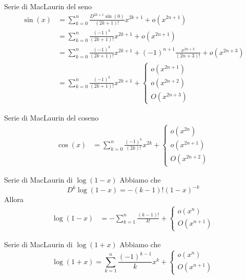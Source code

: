 \documentclass[a4paper]{article}
\begin{document}
\begin{snippetproposition}{Serie di MacLaurin del seno}
    \begin{align*}
        \sin(x) &= \sum_{k=0}^n \frac{D^{2k+1}\sin(0)}{(2k+1)!} x^{2k+1} + o(x^{2n+1}) \\
        &= \sum_{k=0}^n \frac{{(-1)}^k}{(2k+1)!} x^{2k+1} + o(x^{2n+1}) \\
        &= \sum_{k=0}^n \frac{{(-1)}^k}{(2k+1)!} x^{2k+1} + {(-1)}^{n+1}
        \frac{x^{2n+3}}{(2n+3)!} + o(x^{2n+3}) \\
        &= \sum_{k=0}^n \frac{{(-1)}^k}{(2k+1)!} x^{2k+1} + \begin{cases}
            o(x^{2n+1}) \\
            o(x^{2n+2}) \\
            O(x^{2n+3})
        \end{cases}
    \end{align*}
\end{snippetproposition}

\begin{snippetproposition}{Serie di MacLaurin del coseno}
    \begin{align*}
        \cos(x) &= \sum_{k=0}^n \frac{{(-1)}^k}{(2k)!} x^{2k}
        + \begin{cases}
            o(x^{2n}) \\
            o(x^{2n+1}) \\
            O(x^{2n+2})
        \end{cases}
    \end{align*}
\end{snippetproposition}

\begin{snippetproposition}{Serie di MacLaurin di \(\log(1-x)\)}
    Abbiamo che
    \[
        D^k \log(1-x) = -(k-1)!{(1-x)}^{-k}
    \]
    Allora
    \begin{align*}
        \log(1-x) &= -\sum_{k=1}^n \frac{{(k-1)!}}{k!}
        + \begin{cases}
            o(x^{n}) \\
            O(x^{n+1})
        \end{cases}
    \end{align*}
\end{snippetproposition}

\begin{snippetproposition}{Serie di MacLaurin di \(\log(1+x)\)}
    Abbiamo che
    \[
        \log(1+x) = \sum_{k=1}^n \frac{{(-1)}^{k-1}}{k} x^k +
        \begin{cases}
            o(x^n) \\
            O(x^{n+1})
        \end{cases}
    \]
\end{snippetproposition}
\end{document}
